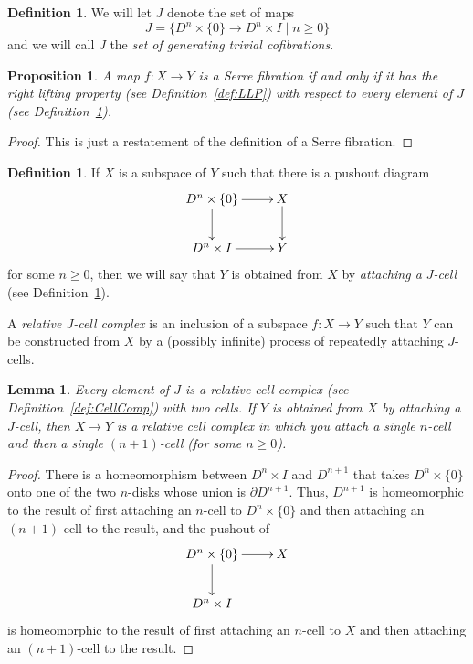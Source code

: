 \documentclass{amsart}
\numberwithin{equation}{section}
\theoremstyle{slplain}
\newtheorem{lem}[equation]{Lemma}
\newtheorem{prop}[equation]{Proposition}
\theoremstyle{definition}
\newtheorem{defn}[equation]{Definition} %
\theoremstyle{remark}
\newcommand{\defref}{Definition~\ref}
\newcommand{\suchthat}{\mid}
\begin{document}
\begin{defn}
  \label{def:gtc}
  We will let $J$ denote the set of maps
  \begin{displaymath}
    J = \bigl\{D^{n}\times\{0\} \to D^{n}\times I
        \suchthat n \ge 0\bigr\}
  \end{displaymath}
  and we will call $J$ the \emph{set of generating trivial
    cofibrations}.
\end{defn}


\begin{prop}
  \label{prop:defSfib}
  A map $f\colon X \to Y$ is a Serre fibration if and only if it has
  the right lifting property (see \defref{def:LLP}) with respect to
  every element of $J$ (see \defref{def:gtc}).
\end{prop}

\begin{proof}
  This is just a restatement of the definition of a Serre fibration.
\end{proof}


\begin{defn}
  \label{def:RlJClCmp}
  If $X$ is a subspace of $Y$ such that there is a pushout diagram
  \begin{displaymath}
    \xymatrix{
      {D^{n}\times \{0\}} \ar[r] \ar[d]
      & {X} \ar[d]\\
      {D^{n}\times I} \ar[r]
      & {Y}
    }
  \end{displaymath}
  for some $n \ge 0$, then we will say that $Y$ is obtained from $X$
  by \emph{attaching a $J$-cell} (see \defref{def:gtc}).

  A \emph{relative $J$-cell complex} is an inclusion of a subspace
  $f\colon X \to Y$ such that $Y$ can be constructed from $X$ by a
  (possibly infinite) process of repeatedly attaching $J$-cells.
\end{defn}


\begin{lem}
  \label{lem:Jcell}
  Every element of $J$ is a relative cell complex (see
  \defref{def:CellComp}) with two cells.  If $Y$ is obtained from $X$
  by attaching a $J$-cell, then $X \to Y$ is a relative cell complex
  in which you attach a single $n$-cell and then a single $(n+1)$-cell
  (for some $n \ge 0$).
\end{lem}

\begin{proof}
  There is a homeomorphism between $D^{n}\times I$ and $D^{n+1}$ that
  takes $D^{n}\times\{0\}$ onto one of the two $n$-disks whose union
  is $\partial D^{n+1}$.  Thus, $D^{n+1}$ is homeomorphic to the
  result of first attaching an $n$-cell to $D^{n}\times \{0\}$ and then
  attaching an $(n+1)$-cell to the result, and the pushout of
  \begin{displaymath}
    \xymatrix{
      {D^{n}\times\{0\}} \ar[r] \ar[d]
      & {X}\\
      {D^{n}\times I}
    }
  \end{displaymath}
  is homeomorphic to the result of first attaching an $n$-cell to $X$
  and then attaching an $(n+1)$-cell to the result.
\end{proof}
\end{document}
